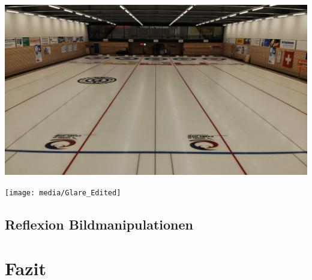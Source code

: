 \documentclass[11pt]{article}
\begin{document}
    \noindent
    \begin{minipage}{0.5\textwidth}
        \includegraphics[width=\linewidth]{media/Glare_Unedited}
    \end{minipage}
    \hfill
    \begin{minipage}[c]{0.5\textwidth}
        \texttt{[image: media/Glare\_Edited]}
    \end{minipage}

    \subsection{Reflexion Bildmanipulationen}

    \section{Fazit}
\end{document}
